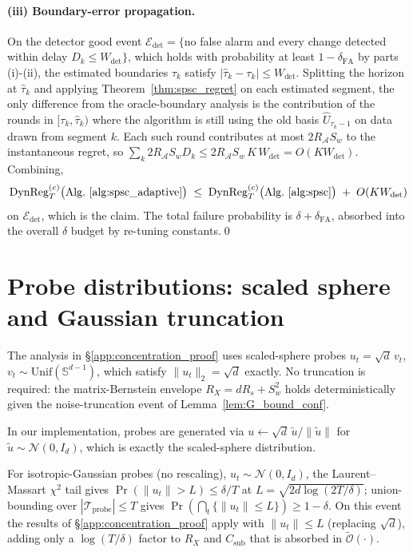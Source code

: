 \documentclass{article}
\newcommand{\cA}{\mathcal{A}}
\newcommand{\cTprobe}{\mathcal{T}_{\mathrm{probe}}}
\newcommand{\tilO}{\widetilde{\mathcal{O}}}
\newcommand{\DynReg}{\mathrm{DynReg}}
\begin{document}
\paragraph{(iii) Boundary-error propagation.}
On the detector good event
$\mathcal E_{\mathrm{det}}=\bigl\{$no false alarm and every change
detected within delay $D_k\le W_{\mathrm{det}}\bigr\}$, which holds
with probability at least $1-\delta_{\mathrm{FA}}$ by parts (i)-(ii),
the estimated boundaries $\widehat\tau_k$ satisfy
$|\widehat\tau_k-\tau_k|\le W_{\mathrm{det}}$. Splitting the horizon
at $\widehat\tau_k$ and applying Theorem~\ref{thm:spsc_regret} on
each estimated segment, the only difference from the oracle-boundary
analysis is the contribution of the rounds in
$[\tau_k,\widehat\tau_k)$ where the algorithm is still using the old
basis $\widehat U_{\tau_k-1}$ on data drawn from segment $k$. Each
such round contributes at most $2R_\cA S_w$ to the instantaneous
regret, so
$\sum_k 2R_\cA S_w D_k\le 2R_\cA S_w\,K\,W_{\mathrm{det}}=O(K W_{\mathrm{det}})$.
Combining,
\[
\DynReg_T^{(c)}\bigl(\text{Alg.~\ref{alg:spsc_adaptive}}\bigr)
\;\le\;
\DynReg_T^{(c)}\bigl(\text{Alg.~\ref{alg:spsc}}\bigr)
\;+\; O(K W_{\mathrm{det}})
\]
on $\mathcal E_{\mathrm{det}}$, which is the claim. The total
failure probability is $\delta+\delta_{\mathrm{FA}}$, absorbed into
the overall $\delta$ budget by re-tuning constants.\qed

\section{Probe distributions: scaled sphere and Gaussian truncation}
\label{app:truncation}

The analysis in \S\ref{app:concentration_proof} uses scaled-sphere
probes $u_t = \sqrt d\,v_t$, $v_t\sim\mathrm{Unif}(\mathbb S^{d-1})$,
which satisfy $\|u_t\|_2 = \sqrt d$ exactly. No truncation is
required: the matrix-Bernstein envelope $R_X = d R_s + S_w^2$ holds
deterministically given the noise-truncation event of
Lemma~\ref{lem:G_bound_conf}.

In our implementation, probes are generated via
$u\leftarrow\sqrt d\,\tilde u/\|\tilde u\|$ for
$\tilde u\sim\mathcal N(0,I_d)$, which is exactly the scaled-sphere
distribution.

For isotropic-Gaussian probes (no rescaling),
$u_t\sim\mathcal N(0,I_d)$, the Laurent--Massart $\chi^2$ tail
\citep[Lem.~1]{laurent2000adaptive} gives
$\Pr(\|u_t\|>L)\le\delta/T$ at $L=\sqrt{2d\log(2T/\delta)}$;
union-bounding over $|\cTprobe|\le T$ gives
$\Pr(\bigcap_t\{\|u_t\|\le L\})\ge 1-\delta$. On this event the
results of \S\ref{app:concentration_proof} apply with $\|u_t\|\le L$
(replacing $\sqrt d$), adding only a $\log(T/\delta)$ factor to $R_X$
and $C_{\mathrm{sub}}$ that is absorbed in $\tilO(\cdot)$.
\end{document}
